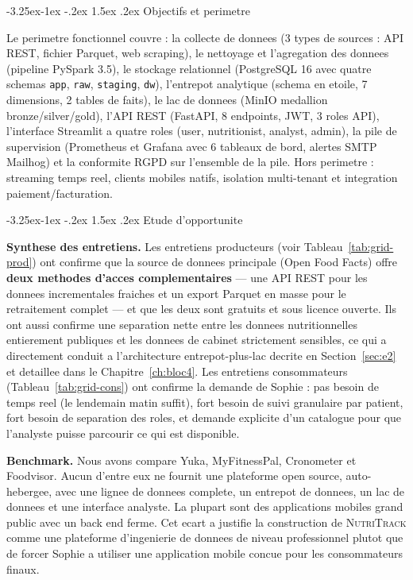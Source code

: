 \documentclass[a4paper,11pt,oneside,openany]{report}
\makeatletter
\renewcommand\subsubsection{\@startsection{subsubsection}{3}{\z@}%
  {-3.25ex\@plus -1ex \@minus -.2ex}%
  {1.5ex \@plus .2ex}%
  {\normalfont\normalsize\bfseries\color{ntblue}}}
\newcommand{\nutritrack}{\textsc{NutriTrack}}
\newcommand{\off}{Open Food Facts}
\newcommand{\rgpd}{RGPD}
\makeatother
\begin{document}
\subsubsection{Objectifs et perimetre}

Le perimetre fonctionnel couvre : la collecte de donnees (3 types de
sources : API REST, fichier Parquet, web scraping), le nettoyage et
l'agregation des donnees (pipeline PySpark 3.5), le stockage
relationnel (PostgreSQL 16 avec quatre schemas \texttt{app},
\texttt{raw}, \texttt{staging}, \texttt{dw}), l'entrepot analytique
(schema en etoile, 7 dimensions, 2 tables de faits), le lac de
donnees (MinIO medallion bronze/silver/gold), l'API REST (FastAPI,
8 endpoints, JWT, 3 roles API), l'interface Streamlit a quatre roles
(user, nutritionist, analyst, admin), la pile de supervision
(Prometheus et Grafana avec 6 tableaux de bord, alertes SMTP
Mailhog) et la conformite \rgpd{} sur l'ensemble de la pile. Hors
perimetre : streaming temps reel, clients mobiles natifs, isolation
multi-tenant et integration paiement/facturation.

\subsubsection{Etude d'opportunite}

\textbf{Synthese des entretiens.} Les entretiens producteurs (voir
Tableau~\ref{tab:grid-prod}) ont confirme que la source de donnees
principale (\off{}) offre \textbf{deux methodes d'acces
complementaires} --- une API REST pour les donnees incrementales
fraiches et un export Parquet en masse pour le retraitement complet
--- et que les deux sont gratuits et sous licence ouverte. Ils ont
aussi confirme une separation nette entre les donnees nutritionnelles
entierement publiques et les donnees de cabinet strictement
sensibles, ce qui a directement conduit a l'architecture
entrepot-plus-lac decrite en Section~\ref{sec:e2} et detaillee dans
le Chapitre~\ref{ch:bloc4}. Les entretiens consommateurs
(Tableau~\ref{tab:grid-cons}) ont confirme la demande de Sophie : pas
besoin de temps reel (le lendemain matin suffit), fort besoin de suivi
granulaire par patient, fort besoin de separation des roles, et
demande explicite d'un catalogue pour que l'analyste puisse parcourir
ce qui est disponible.

\textbf{Benchmark.} Nous avons compare Yuka, MyFitnessPal, Cronometer
et Foodvisor. Aucun d'entre eux ne fournit une plateforme open source,
auto-hebergee, avec une lignee de donnees complete, un entrepot de
donnees, un lac de donnees et une interface analyste. La plupart sont
des applications mobiles grand public avec un back end ferme. Cet
ecart a justifie la construction de \nutritrack{} comme une plateforme
d'ingenierie de donnees de niveau professionnel plutot que de forcer
Sophie a utiliser une application mobile concue pour les consommateurs
finaux.
\end{document}
